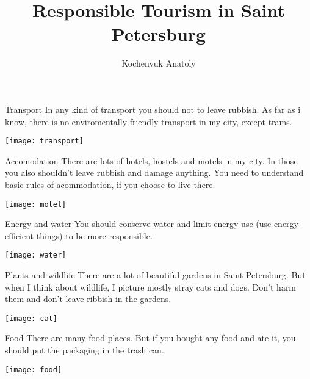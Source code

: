 \documentclass[11pt]{beamer}
\author{Kochenyuk Anatoly}
\title{Responsible Tourism in Saint Petersburg}
\begin{document}
\begin{frame}
\titlepage
\end{frame}


\begin{frame}{Transport}
In any kind of transport you should not to leave rubbish. As far as i know, there is no enviromentally-friendly transport in my city, except trams.
\begin{center}
\texttt{[image: transport]}
\end{center}
\end{frame}

\begin{frame}{Accomodation}
	There are lots of hotels, hostels and motels in my city.
	In those you also shouldn't leave rubbish and damage anything. You need to understand basic rules of acommodation, if you choose to live there.  
	\begin{center}
	\texttt{[image: motel]}
	\end{center}
\end{frame}


\begin{frame}{Energy and water}
	You should conserve water and limit energy use (use energy-efficient things) to be more responsible.
	\begin{center}
	\texttt{[image: water]}
	\end{center}
\end{frame}

\begin{frame}{Plants and wildlife}
	There are a lot of beautiful gardens in Saint-Petersburg. But when I think about wildlife, I picture mostly stray cats and dogs. Don't harm them and don't leave ribbish in the gardens.
	\begin{center}
	\texttt{[image: cat]}
	\end{center}
\end{frame}

\begin{frame}{Food}
	There are many food places. But if you bought any food and ate it, you should put the packaging in the trash can.
	\begin{center}
	\texttt{[image: food]}
	\end{center}
\end{frame}
\end{document}
